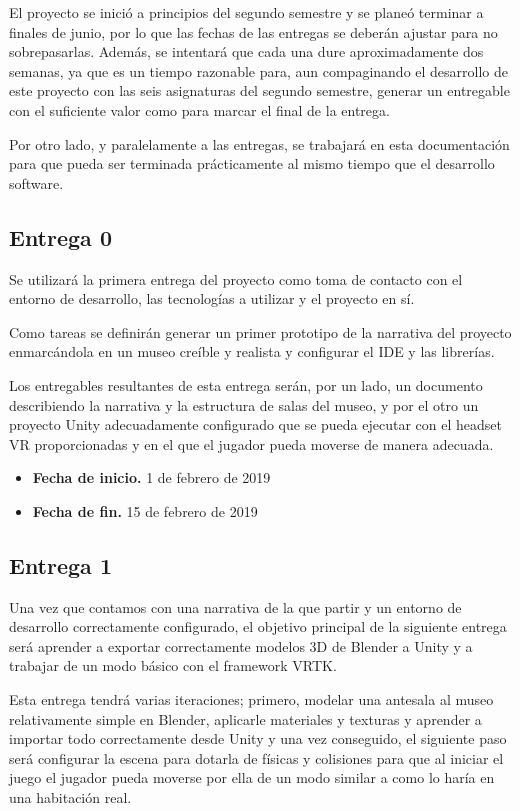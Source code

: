 El proyecto se inició a principios del segundo semestre y se planeó terminar a finales de junio, por lo que las fechas de las entregas se deberán ajustar para no sobrepasarlas. Además, se intentará que cada una dure aproximadamente dos semanas, ya que es un tiempo razonable para, aun compaginando el desarrollo de este proyecto con las seis asignaturas del segundo semestre, generar un entregable con el suficiente valor como para marcar el final de la entrega.

Por otro lado, y paralelamente a las entregas, se trabajará en esta documentación para que pueda ser terminada prácticamente al mismo tiempo que el desarrollo software.

\subsection{Entrega 0}

Se utilizará la primera entrega del proyecto como toma de contacto con el entorno de desarrollo, las tecnologías a utilizar y el proyecto en sí.

Como tareas se definirán generar un primer prototipo de la narrativa del proyecto enmarcándola en un museo creíble y realista y configurar el \acs{IDE} y las librerías.

Los entregables resultantes de esta entrega serán, por un lado, un documento describiendo la narrativa y la estructura de salas del museo, y por el otro un proyecto Unity adecuadamente configurado que se pueda ejecutar con el headset \acs{VR} proporcionadas y en el que el jugador pueda moverse de manera adecuada.

\begin{itemize}
    \item \textbf{Fecha de inicio.} 1 de febrero de 2019
    \item \textbf{Fecha de fin.} 15 de febrero de 2019
\end{itemize}

\subsection{Entrega 1}

Una vez que contamos con una narrativa de la que partir y un entorno de desarrollo correctamente configurado, el objetivo principal de la siguiente entrega será aprender a exportar correctamente modelos 3D de Blender a Unity y a trabajar de un modo básico con el framework \acs{VRTK}.

Esta entrega tendrá varias iteraciones; primero, modelar una antesala al museo relativamente simple en Blender, aplicarle materiales y texturas y aprender a importar todo correctamente desde Unity y una vez conseguido, el siguiente paso será configurar la escena para dotarla de físicas y colisiones para que al iniciar el juego el jugador pueda moverse por ella de un modo similar a como lo haría en una habitación real.

